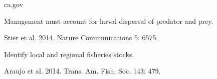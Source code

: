 \documentclass[t]{beamer}
\begin{document}
{
\begin{frame}[b]

	\tiny ca.gov
\end{frame}
}
%
{
\begin{frame}[b]{Management must account for larval dispersal of predator and prey.}

	\hfill \tiny Stier et al. 2014. Nature Communications 5: 6575.
\end{frame}
}
%
{
\begin{frame}[b]{Identify local and regional fisheries stocks.}

	\hfill \tiny Araujo et al. 2014. Trans. Am. Fish. Soc. 143: 479.
\end{frame}
}
%
\end{document}
